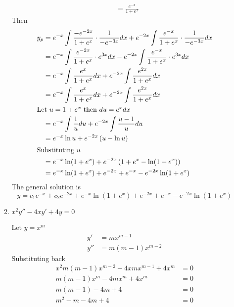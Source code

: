 \documentclass{zc-ust-hw}
\begin{document}
\begin{enumerate}
\begin{enumerate}
\begin{sol}
\begin{align}
                &= \frac{e^{-x}}{1+e^{x} }
              \end{align}
              Then
              \begin{align}
                y_{p} &= e^{-x}\int \frac{-e^{-2x}}{1+e^{x} }\cdot \frac{1}{-e^{-3x} }dx+e^{-2x}\int \frac{e^{-x}}{1+e^{x} }\cdot \frac{1}{-e^{-3x} }dx \\
                &= e^{-x}\int \frac{e^{-2x}}{1+e^{x} }\cdot e^{3x}dx-e^{-2x}\int \frac{e^{-x}}{1+e^{x} }\cdot e^{3x}dx \\
                &= e^{-x}\int \frac{e^{x}}{1+e^{x} }dx+e^{-2x}\int \frac{e^{2x} }{1+e^{x}}dx \\
                &= e^{-x}\int \frac{e^{x}}{1+e^{x} }dx+e^{-2x}\int \frac{e^{2x} }{1+e^{x}}dx \\
                \intertext{Let \( u=1+e^{x} \) then \( du=e^{x}dx \)}
                &= e^{-x}\int \frac{1}{u}du+e^{-2x}\int \frac{u-1}{u}du \\
                &= e^{-x}\ln u+e^{-2x}\left( u-\ln u \right) \\
                \intertext{Substituting \( u \)}
                &= e^{-x}\ln(1+e^{x})+e^{-2x}\left( 1+e^{x}-\ln(1+e^{x}) \right) \\
                &= e^{-x}\ln(1+e^{x})+e^{-2x}+e^{-x}-e^{-2x}\ln(1+e^{x})
              \end{align}
              The general solution is
              \begin{equation}
                \boxed{y=c_{1}e^{-x}+c_{2}e^{-2x}+e^{-x}\ln(1+e^{x})+e^{-2x}+e^{-x}-e^{-2x}\ln(1+e^{x})}
              \end{equation}
            \end{sol}
          \item \( x^2y''-4xy'+4y=0 \)
            \begin{sol} Let \( y=x^m \)
              \begin{align}
                y'&=mx^{m-1} \\
                y''&=m(m-1)x^{m-2}
              \end{align}
              Substituting back
              \begin{align}
                x^2m(m-1)x^{m-2}-4xmx^{m-1}+4x^m&=0 \\
                m(m-1)x^{m} -4mx^{m}+4x^m&=0 \\
                m(m-1)-4m+4&=0 \\
                m^2-m-4m+4&=0 \\

\end{align}
\end{sol}
\end{enumerate}
\end{enumerate}
\end{document}
